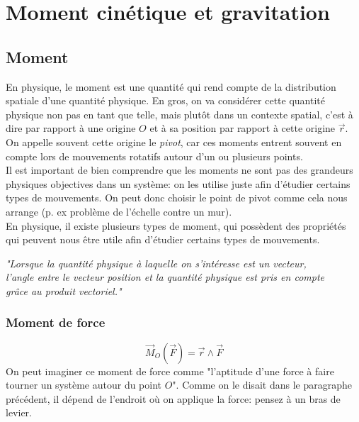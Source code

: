 \documentclass{article}
\numberwithin{equation}{section}
\begin{document}
\section{Moment cinétique et gravitation}

\subsection{Moment}
En physique, le moment est une quantité qui rend compte de la distribution spatiale d'une quantité physique. En gros, on va considérer cette quantité physique non pas en tant que telle, mais plutôt dans un contexte spatial, c'est à dire par rapport à une origine \(O\) et à sa position par rapport à cette origine \(\vec r\). On appelle souvent cette origine le \emph{pivot}, car ces moments entrent souvent en compte lors de mouvements rotatifs autour d'un ou plusieurs points. \\ Il est important de bien comprendre que les moments ne sont pas des grandeurs physiques objectives dans un système: on les utilise juste afin d'étudier certains types de mouvements. On peut donc choisir le point de pivot comme cela nous arrange (p. ex problème de l'échelle contre un mur). \\

En physique, il existe plusieurs types de moment, qui possèdent des propriétés qui peuvent nous être utile afin d'étudier certains types de mouvements. \\

\begin{center}
	\emph{"Lorsque la quantité physique à laquelle on s'intéresse est un vecteur, \\ l'angle entre le vecteur position et la quantité physique est pris en compte \\ grâce au produit vectoriel."}
\end{center}

\subsubsection{Moment de force}
\begin{equation}
	\boxed{ \vec M_O ( \vec F ) = \vec r \wedge \vec F }
\end{equation}
On peut imaginer ce moment de force comme "l'aptitude d'une force à faire tourner un système autour du point \(O\)". Comme on le disait dans le paragraphe précédent, il dépend de l'endroit où on applique la force: pensez à un bras de levier.
\end{document}
